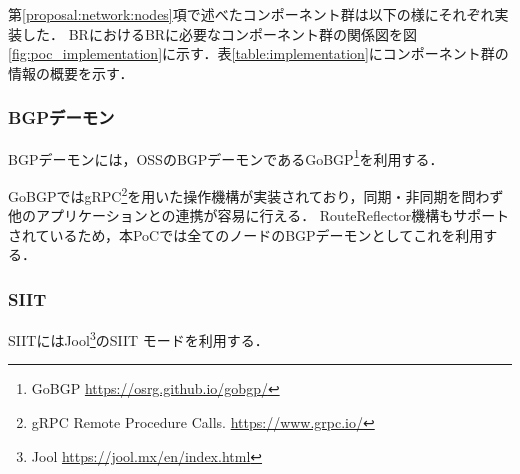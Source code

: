 \begin{table}[h]
    \label{table:implementation}
    \caption{PoCの実装に利用したソフトウェア群}
\end{table}

第\ref{proposal:network:nodes}項で述べたコンポーネント群は以下の様にそれぞれ実装した．
BRにおけるBRに必要なコンポーネント群の関係図を図\ref{fig:poc_implementation}に示す．表\ref{table:implementation}にコンポーネント群の情報の概要を示す．


\subsubsection{BGPデーモン}
BGPデーモンには，OSSのBGPデーモンであるGoBGP\footnote{GoBGP \url{https://osrg.github.io/gobgp/}}を利用する．

GoBGPではgRPC\footnote{gRPC Remote Procedure Calls. \url{https://www.grpc.io/}}を用いた操作機構が実装されており，同期・非同期を問わず他のアプリケーションとの連携が容易に行える．
RouteReflector機構もサポートされているため，本PoCでは全てのノードのBGPデーモンとしてこれを利用する．

\subsubsection{SIIT}
SIITにはJool\footnote{Jool  \url{https://jool.mx/en/index.html}}のSIIT モードを利用する．

